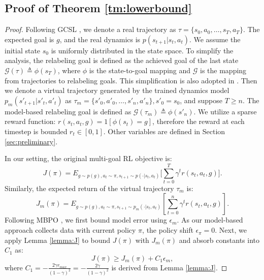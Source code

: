 \documentclass{article}
\begin{document}
\subsection{Proof of Theorem \ref{tm:lowerbound}}
\label{ap:proof}
\begin{proof}
Following GCSL \cite{ghosh2021learning}, we denote a real trajectory as $\tau = \{s_0,a_0,\ldots, s_T, a_T\}$. The expected goal is $g$, and the real dynamics is $p(s_{t+1}|s_t,a_t)$. We assume the initial state $s_0$ is uniformly distributed in the state space. To simplify the analysis, the relabeling goal is defined as the achieved goal of the last state $\mathcal{G}(\tau) \triangleq \phi(s_T)$, where $\phi$ is the state-to-goal mapping and $\mathcal{G}$ is the mapping from trajectories to relabeling goals. This simplification is also adopted in \cite{ghosh2021learning}. Then we denote a virtual trajectory generated by the trained dynamics model $p_m(s'_{t+1}|s'_t,a'_t)$ as $\tau_m = \{s'_0, a'_0, \ldots, s'_n, a'_n\}, s'_0=s_0$, and suppose $T\geq n$. The model-based relabeling goal is defined as $\mathcal{G}(\tau_m)\triangleq \phi(s'_n)$. We utilize a sparse reward function: $r(s_t,a_t,g) = 1[\phi(s_t) = g]$, therefore the reward at each timestep is bounded $r_t \in[0,1]$. Other variables are defined in Section \ref{sec:preliminary}.

In our setting, the original multi-goal RL objective is:
\begin{equation*}
    J(\pi)=E_{g\sim p(g),a_t \sim \pi, s_{t+1}\sim p(\cdot|s_t,a_t)}\big[\sum^{T}_{t=0} \gamma^t r(s_t, a_t, g) \big] .
\end{equation*}
Similarly, the expected return of the virtual trajectory $\tau_m$ is:
\begin{equation*}
    J_m(\pi)=E_{g\sim p(g),a_t\sim\pi, s_{t+1}\sim p_m(\cdot|s_t,a_t)}[\sum_{t=0}^{n} \gamma^tr(s_t,a_t,g)] .
\end{equation*}
Following MBPO \cite{DBLP:conf/nips/JannerFZL19}, we first bound model error using $\epsilon_m$.
As our model-based approach collects data with current policy $\pi$, the policy shift $\epsilon_{\pi}=0$. Next, we apply Lemma \ref{lemma:J} to bound $J(\pi)$ with $J_m(\pi)$ and absorb constants into $C_1$ as:
\begin{equation*}
    J(\pi) \geq J_m(\pi) + C_1 \epsilon_m ,
\end{equation*}
where $C_1=-\frac{2\gamma r_{max}}{(1-\gamma)^2}=-\frac{2\gamma}{(1-\gamma)^2}$ is derived from Lemma \ref{lemma:J}.



\end{proof}
\end{document}
